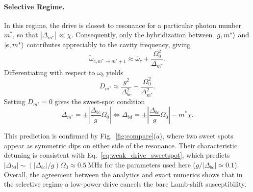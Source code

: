 \paragraph{Selective Regime.}
In this regime, the drive is closest to resonance for a particular photon number \(m^\ast\), so that \(|\Delta_{m^\ast}|\ll \chi\).
Consequently, only the hybridization between \(|g,m^\ast\rangle\) and \(|e,m^\ast\rangle\) contributes appreciably to the cavity frequency, giving
\begin{equation}
\widetilde{\omega}_{c,m^\ast\rightarrow m^\ast+1}
\approx
\bar{\omega}_c+\frac{\Omega_0^2}{\Delta_{m^\ast}}.
\end{equation}
Differentiating with respect to \(\omega_b\) yields
\begin{equation}
\label{eq:Dm_selective}
D_{m^\ast}
\approx
\frac{g^2}{\Delta_{bc}^2}
-\frac{\Omega_0^2}{\Delta_{m^\ast}^2}.
\end{equation}
Setting \(D_{m^\ast}=0\) gives the sweet-spot condition
\begin{equation}
\label{eq:weak_drive_sweetspot}
\Delta_{m^\ast}=\pm \left|\frac{\Delta_{bc}}{g}\Omega_0\right|
\Longleftrightarrow
\Delta_{bd}=\pm \left|\frac{\Delta_{bc}}{g}\Omega_0\right|-m^\ast\chi .
\end{equation}

This prediction is confirmed by Fig.~\ref{fig:compare}(a), where two sweet spots appear as symmetric dips on either side of the resonance.
Their characteristic detuning is consistent with Eq.~\eqref{eq:weak_drive_sweetspot}, which predicts
\(|\Delta_{bd}|\sim (|\Delta_{bc}|/g)\Omega_0\approx 0.5~\mathrm{MHz}\) for the parameters used here (\(g/|\Delta_{bc}|\simeq 0.1\)).
Overall, the agreement between the analytics and exact numerics shows that in the selective regime a low-power drive cancels the bare Lamb-shift susceptibility.


